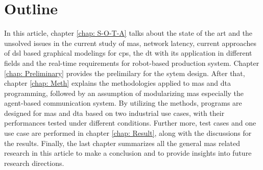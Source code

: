 \section{Outline}
In this article, chapter \ref{chap: S-O-T-A} talks about the state of the art and 
the unsolved issues in the current study of \gls{mas}, network 
latency, current approaches of \gls{dsl} 
based graphical modelings for \gls{cps}, the \gls{dt} with 
its application in different fields and the real-time requirements 
for robot-based production system. Chapter \ref{chap: Preliminary} 
provides the prelimilary for the sytem design. After that, 
chapter \ref{chap: Meth} explains 
the methodologies applied to \gls{mas} and \gls{dta} programming, 
followed by an assumption of modularizing \gls{mas} especially the agent-based 
communication system. By utilizing the methods, programs are 
designed for \gls{mas} and \gls{dta} based on two industrial use cases, 
with their performances tested under different conditions. 
Further more, test cases and one use case are 
performed in chapter \ref{chap: Result}, along with 
the discussions for the results. Finally, the last chapter summarizes 
all the general \gls{mas} related research in this article to make a 
conclusion and to provide insights into future research directions.  